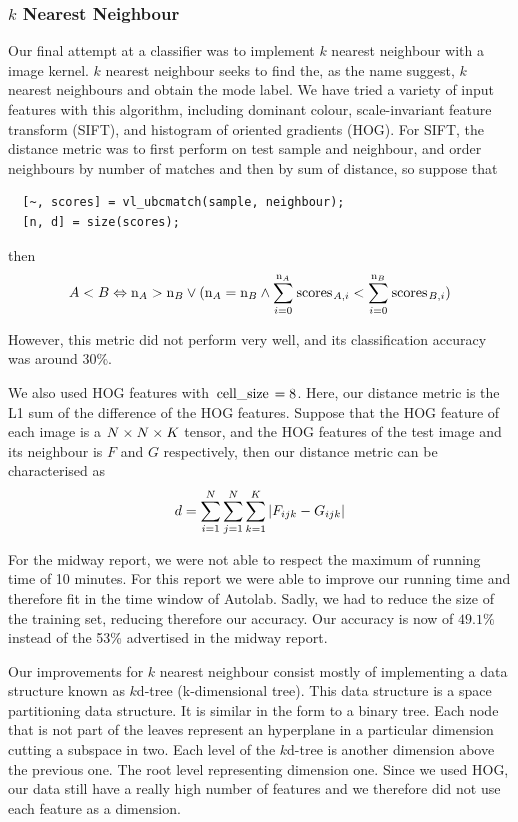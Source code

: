 \documentclass{article} %
\begin{document}
\subsubsection{$k$ Nearest Neighbour}
Our final attempt at a classifier was to implement $k$ nearest neighbour with a image kernel. $k$ nearest neighbour seeks to find the, as the name suggest, $k$ nearest neighbours and obtain the mode label. We have tried a variety of input features with this algorithm, including dominant colour, scale-invariant feature transform (SIFT), and histogram of oriented gradients (HOG). For SIFT, the distance metric was to first perform  on test sample and neighbour, and order neighbours by number of matches and then by sum of distance, so suppose that
\begin{lstlisting}
  [~, scores] = vl_ubcmatch(sample, neighbour);
  [n, d] = size(scores);
\end{lstlisting}
then
$$A < B \eqv \codem{n}_A>\codem{n}_B \/ (\codem{n}_A=\codem{n}_B\+\summ{i=0}{\codem{n}_A}{\codem{scores}_{A,i}}<\summ{i=0}{\codem{n}_B}{\codem{scores}_{B,i}})$$

However, this metric did not perform very well, and its classification accuracy was around $30\%$.

We also used HOG features with $\codem{cell_size}=8$. Here, our distance metric is the L1 sum of the difference of the HOG features. Suppose that the HOG feature of each image is a $N\x N\x K$ tensor, and the HOG features of the test image and its neighbour is $F$ and $G$ respectively, then our distance metric can be characterised as
$$d=\summ{i=1}{N}\summ{j=1}{N}\summ{k=1}{K}|F_{ijk}-G_{ijk}|$$

For the midway report, we were not able to respect the maximum of running time of 10 minutes. For this report we were able to improve our running time and therefore fit in the time window of Autolab. Sadly, we had to reduce the size of the training set, reducing therefore our accuracy. Our accuracy is now of $49.1\%$ instead of the 53\% advertised in the midway report.

Our improvements for  $k$ nearest neighbour consist mostly of implementing a data structure known as $k$d-tree (k-dimensional tree). This data structure is a space partitioning data structure. It is similar in the form to a binary tree. Each node that is not part of the leaves represent an hyperplane in a particular dimension cutting a subspace in two. Each level of the $k$d-tree is another dimension above the previous one. The root level representing dimension one. Since we used HOG, our data still have a really high number of features and we therefore did not use each feature as a dimension. 
\end{document}
